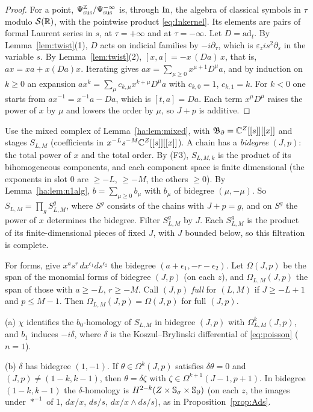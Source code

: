 \begin{proof}
For a point, \(\Psi_{\mathrm{sus}}^{\mathbb Z}/\Psi_{\mathrm{sus}}^{-\infty}\) is, through \(\operatorname{In}\), the
algebra of classical symbols in \(\tau\) modulo \(\mathcal S(\mathbb R)\), with the
pointwise product \eqref{eq:Inkernel}. Its elements are pairs of formal
Laurent series in \(s\), at \(\tau=+\infty\) and at \(\tau=-\infty\). Let
\(D=\mathrm{ad}_t\). By Lemma~\ref{lem:twist}(1), \(D\) acts on indicial
families by \(-i\partial_\tau\), which is \(\varepsilon_zis^2\partial_s\)
in the variable \(s\). By Lemma~\ref{lem:twist}(2),
\([x,a]=-x\,(Da)\,x\), that is, \(ax=xa+x(Da)x\). Iterating gives
\(ax=\sum_{\mu\ge0}x^{\mu+1}D^\mu a\), and by induction on \(k\ge0\) an
expansion \(ax^k=\sum_\mu c_{k,\mu}x^{k+\mu}D^\mu a\) with \(c_{k,0}=1\),
\(c_{k,1}=k\). For \(k<0\) one starts from \(ax^{-1}=x^{-1}a-Da\), which
is \([t,a]=Da\). Each term \(x^\mu D^\mu\) raises the power of \(x\) by
\(\mu\) and lowers the order by \(\mu\), so \(J+p\) is additive.
\end{proof}

Use the mixed complex of Lemma~\ref{ha:lem:mixed}, with \(\mathfrak
B_\partial=\mathbb C^Z[[s]][[x]]\) and stages \(S_{L,M}\) (coefficients in
\(x^{-L}s^{-M}\mathbb C^Z[[s]][[x]]\)). A chain has a \emph{bidegree}
\((J,p)\): the total power of \(x\) and the total order. By (F3),
\(S_{L,M,k}\) is the product of its bihomogeneous components, and each
component space is finite dimensional (the exponents in slot \(0\) are
\(\ge-L\), \(\ge-M\), the others \(\ge0\)). By
Lemma~\ref{ha:lem:n1alg}, \(b=\sum_{\mu\ge0}b_\mu\) with \(b_\mu\) of
bidegree \((\mu,-\mu)\). So \(S_{L,M}=\prod_gS^g_{L,M}\), where
\(S^g\) consists of the chains with \(J+p=g\), and on \(S^g\) the power of
\(x\) determines the bidegree. Filter \(S^g_{L,M}\) by \(J\). Each
\(S^g_{L,M}\) is the product of its finite-dimensional pieces of fixed
\(J\), with \(J\) bounded below, so this filtration is complete.

For forms, give \(x^as^r\,dx^{\epsilon_1}ds^{\epsilon_2}\) the bidegree
\((a+\epsilon_1,-r-\epsilon_2)\). Let \(\Omega(J,p)\) be the span of the
monomial forms of bidegree \((J,p)\) (on each \(z\)), and
\(\Omega_{L,M}(J,p)\) the span of those with \(a\ge-L\), \(r\ge-M\).
Call \((J,p)\) \emph{full} for \((L,M)\) if \(J\ge-L+1\) and \(p\le M-1\).
Then \(\Omega_{L,M}(J,p)=\Omega(J,p)\) for full \((J,p)\).

\begin{lemma}\label{ha:lem:n1E1}
\textup{(a)} \(\chi\) identifies the \(b_0\)-homology of \(S_{L,M}\) in
bidegree \((J,p)\) with \(\Omega^k_{L,M}(J,p)\), and \(b_1\) induces
\(-i\delta\), where \(\delta\) is the Koszul--Brylinski differential of
\eqref{eq:poisson} (\(n=1\)).

\textup{(b)} \(\delta\) has bidegree \((1,-1)\). If \(\theta\in\Omega^k(J,p)\)
satisfies \(\delta\theta=0\) and \((J,p)\ne(1-k,k-1)\), then
\(\theta=\delta\zeta\) with \(\zeta\in\Omega^{k+1}(J-1,p+1)\). In bidegree
\((1-k,k-1)\) the \(\delta\)-homology is \(H^{2-k}(Z\times\mathbb S_\sigma\times\mathbb S_\partial)\)
(on each \(z\), the images under \(*^{-1}\) of \(1\), \(dx/x\),
\(ds/s\), \(dx/x\wedge ds/s\)), as in Proposition~\ref{prop:Ads}.
\end{lemma}

